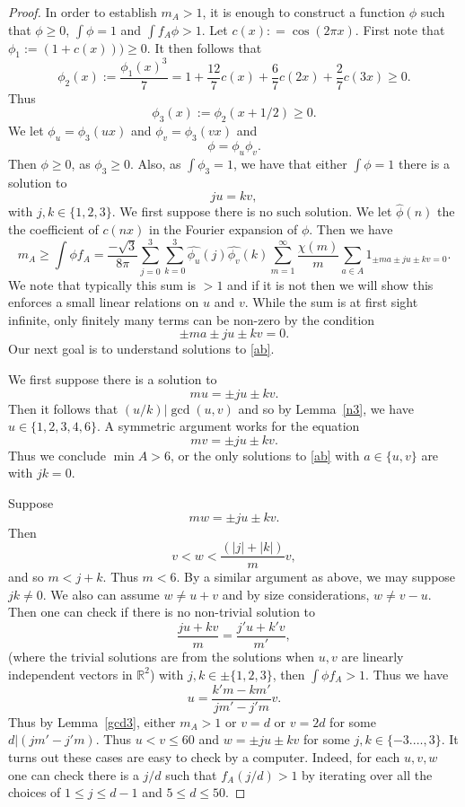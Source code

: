 \documentclass[12pt,reqno]{amsart}
\theoremstyle{dotless}
\begin{document}
\begin{proof} In order to establish $m_A > 1$, it is enough to construct a function $\phi$ such that $\phi \geq 0$, $\int \phi = 1$ and $\int f_A \phi  > 1$. Let $c(x) : = \cos(2\pi x)$. First note that 
$\phi_1 := (1+c(x))) \geq 0$. It then follows that $$\phi_2(x) := \frac{\phi_1(x)^3}{7} = 1 + \frac{12}{7} c(x) + \frac{6}{7} c(2x) + \frac{2}{7} c(3x) \geq 0.$$
Thus 
$$\phi_3(x) := \phi_2(x +1/2) \geq 0.$$
We let $\phi_u = \phi_3(ux)$ and $\phi_v = \phi_3(vx)$ and 
$$\phi = \phi_u \phi_v.$$
Then $\phi \geq 0$, as $\phi_3 \geq 0$. Also, as $\int \phi_3 = 1$, we have that either $\int \phi = 1$ there is a solution to 
\begin{equation} \label{jukv} ju  = k v,\end{equation}
with $j,k \in \{1,2,3\}$. We first suppose there is no such solution. We let $\widehat{\phi}(n)$ the the coefficient of $c(nx)$ in the Fourier expansion of $\phi$.  Then we have 
$$m_A \geq \int \phi f_A = \frac{-\sqrt{3}}{8\pi} \sum_{j=0}^3 \sum_{k=0}^3 \widehat{\phi_u}(j)\widehat{\phi_v}(k) \sum_{m=1}^{\infty} \frac{\chi(m)}{m} \sum_{a\in A} 1_{\pm ma \pm ju \pm kv = 0}  .$$
We note that typically this sum is $> 1$ and if it is not then we will show this enforces a small linear relations on $u$ and $v$. While the sum is at first sight infinite, only finitely many terms can be non-zero by the condition 
\begin{equation}\label{ab} \pm ma \pm ju \pm kv = 0.\end{equation}
Our next goal is to understand solutions to \eqref{ab}. 

 We first suppose there is a solution to 
$$mu = \pm ju \pm k v.$$
Then it follows that $(u/k) | \gcd(u,v) $ and so by Lemma~\ref{n3}, we have $u\in \{1,2,3,4,6\}$. A symmetric argument works for the equation
$$mv = \pm ju \pm k v.$$
Thus we conclude $\min A > 6$, or the only solutions to \eqref{ab} with $a \in \{u,v\}$ are with $jk = 0$. 



Suppose
$$mw = \pm ju \pm kv.$$
Then
$$v < w < \frac{ (|j|+|k|)}{m} v,$$
and so $m < j+k$. Thus $m < 6$. By a similar argument as above, we may suppose $jk \neq 0$. We also can assume $w\neq u+v$ and by size considerations, $w \neq v -u$. Then one can check if there is no non-trivial solution to 
\begin{equation}\label{m} \frac{ju + kv}{m} = \frac{j'u + k'v}{m'},\end{equation}
(where the trivial solutions are from the solutions when $u,v$ are linearly independent vectors in $\mathbb{R}^2$) with $j , k \in \pm \{1,2,3\}$,  then $\int \phi f_A > 1$. 
Thus we have 
$$u = \frac{k' m - k m'}{j m' - j' m } v.$$
Thus by Lemma~\ref{gcd3}, either $m_A > 1$ or  $v = d$ or $v = 2d$ for some $d |( j m' - j' m )$. Thus $u < v \leq 60$ and $w = \pm ju \pm kv$ for some $j , k \in \{-3 . \ldots , 3\}$. It turns out these cases are easy to check by a computer. Indeed, for each $u,v,w$ one can check there is a $j/d$ such that $f_A(j/d) > 1$ by iterating over all the choices of $1 \leq j \leq d-1$ and $5 \leq d \leq 50$. 





\end{proof}
\end{document}
